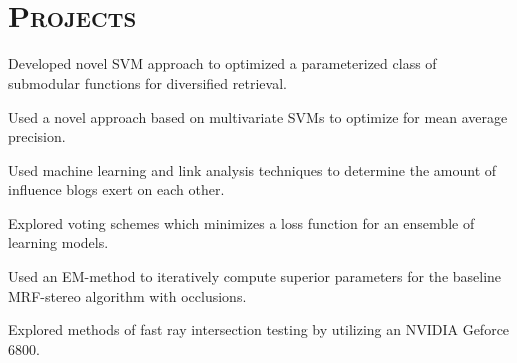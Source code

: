 \begin{resume}
\begin{formatb}
  \\
  \body\\
\end{formatb}

\section{\textsc{Projects}}

\begin{position}
Developed novel SVM approach to optimized a parameterized class of submodular functions for diversified retrieval.
\end{position}

\begin{position}
Used a novel approach based on multivariate SVMs to optimize for mean average precision.
\end{position}

\begin{position}
Used machine learning and link analysis techniques to determine the amount of influence blogs exert on each other.
\end{position}

\begin{position}
Explored voting schemes which minimizes a loss function for an ensemble of learning models. 
\end{position}

\begin{position}
Used an EM-method to iteratively compute superior parameters for the baseline MRF-stereo algorithm with occlusions.
\end{position}

\begin{position}
Explored methods of fast ray intersection testing by utilizing an NVIDIA Geforce 6800.
\end{position}



\end{resume}
